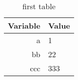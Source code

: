 \begin{table}
\begin{center}
\begin{tabular}{rl} %
\toprule %
Variable & Value\\
\midrule %
a & 1\\
bb & 22\\
ccc & 333\\
\bottomrule %
\end{tabular}
\label{tabMeine}
\caption{first table}
\end{center}
\end{table}